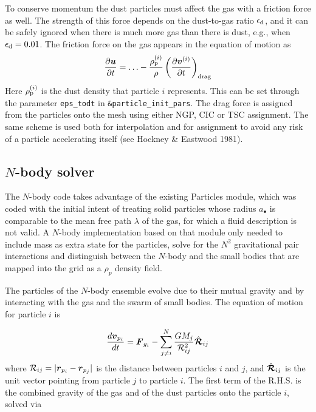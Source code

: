 \documentclass[\mydriver,12pt,twoside,notitlepage,a4paper]{article}
\newcommand{\code}[1]{\texttt{#1}}
\renewcommand{\vec}[1]{\mbox{\boldmath{$#1$}}}
\begin{document}
To conserve momentum the dust particles must affect the gas with a friction
force as well. The strength of this force depends on the dust-to-gas ratio
$\epsilon_{\rm d}$, and it can be safely ignored when there is much more gas
than there is dust, e.g., when $\epsilon_{\rm d}=0.01$. The friction force on
the gas appears in the equation of motion as
\begin{equation}
  \frac{\partial \vec{u}}{\partial t} = \ldots - \frac{\rho_{\rm p}^{(i)}}{\rho}
  \left( \frac{\partial \vec{v}^{(i)}}{\partial t} \right)_{\rm drag}
\end{equation}
Here $\rho_{\rm p}^{(i)}$ is the dust density that particle $i$ represents.
This can be set through the parameter \code{eps_todt} in
\code{\&particle_init_pars}. The drag force is assigned from the particles onto
the mesh using either NGP, CIC or TSC assignment. The same scheme is used both
for interpolation and for assignment to avoid any risk of a particle
accelerating itself (see Hockney \& Eastwood 1981).


\subsection{$N$-body solver}

The $N$-body code takes advantage of the existing Particles module, which was
coded with the initial intent of treating solid particles whose radius
$a_\bullet$ is comparable to the mean free path $\lambda$ of the gas,
for which a fluid description is not valid. A $N$-body implementation
based on that module only needed to include mass as extra state for the
particles, solve for the $N^2$ gravitational pair interactions and
distinguish between the $N$-body and the small bodies that are mapped
into the grid as a $\rho_p$ density field.

The particles of the $N$-body ensemble evolve due to their mutual gravity
and by interacting with the gas and the swarm of small bodies. The equation
of motion for particle $i$ is

\begin{equation}
  \frac{d{\vec{v}}_{p_i}}{dt} = {\vec{F}}_{g_i} -\sum_{j\neq i}^{N}\frac{G M_j}{{\mathcal R}_{ij}^2} \hat{\vec{{\mathcal R}}}_{ij}
  \label{eq:dust-dynamics}
\end{equation}where ${\mathcal R}_{ij}=|\vec{r}_{p_i}-{\vec{r}}_{p_j}|$ is the
distance between particles $i$ and $j$, and $\hat{\vec{{\mathcal R}}}_{ij}$ is
the unit vector pointing from particle $j$ to particle $i$. The first term of
the R.H.S. is the combined gravity of the gas and of the dust particles onto the particle $i$, solved via
\end{document}
